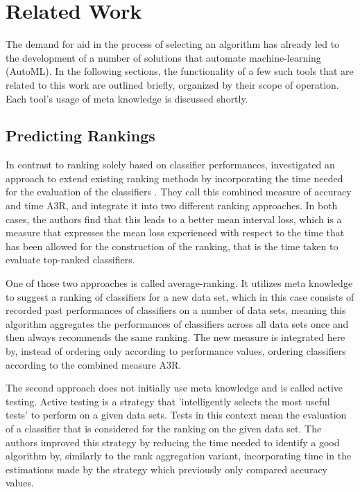 \chapter{Related Work}
\label{sec:related}
The demand for aid in the process of selecting an algorithm has already led to the development of a number of solutions that automate machine-learning (AutoML). In the following sections, the functionality of a few such tools that are related to this work are outlined briefly, organized by their scope of operation. Each tool's usage of meta knowledge is discussed shortly.

\section{Predicting Rankings}
In contrast to ranking solely based on classifier performances, \citeauthor{DBLP:journals/ml/AbdulrahmanBRV18} investigated an approach to extend existing ranking methods by incorporating the time needed for the evaluation of the classifiers \cite{DBLP:journals/ml/AbdulrahmanBRV18}. They call this combined measure of accuracy and time A3R, and integrate it into two different ranking approaches. In both cases, the authors find that this leads to a better mean interval loss, which is a measure that expresses the mean loss experienced with respect to the time that has been allowed for the construction of the ranking, that is the time taken to evaluate top-ranked classifiers. 

One of those two approaches is called average-ranking. It utilizes meta knowledge to suggest a ranking of classifiers for a new data set, which in this case consists of recorded past performances of classifiers on a number of data sets, meaning this algorithm aggregates the performances of classifiers across all data sets once and then always recommends the same ranking. The new measure is integrated here by, instead of ordering only according to performance values, ordering classifiers according to the combined measure A3R.

The second approach does not initially use meta knowledge and is called active testing. Active testing is a strategy that 'intelligently selects the most useful tests' \cite{DBLP:journals/ml/AbdulrahmanBRV18} to perform on a given data sets. Tests in this context mean the evaluation of a classifier that is considered for the ranking on the given data set. The authors improved this strategy by reducing the time needed to identify a good algorithm by, similarly to the rank aggregation variant, incorporating time in the estimations made by the strategy which previously only compared accuracy values.

